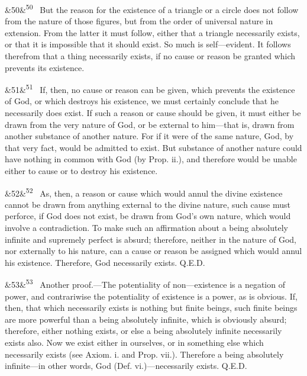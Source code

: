 \documentclass[12pt]{article}
\newcommand{\para}[1][]{\par\noindent\ifx&#1&\else\textsuperscript{\footnotesize #1}~\fi}
\begin{document}
\para[50] But the reason for the existence of a triangle or a circle does not follow from the nature of those figures, but from the order of universal nature in extension. From the latter it must follow, either that a triangle necessarily exists, or that it is impossible that it should exist. So much is self---evident. It follows therefrom that a thing necessarily exists, if no cause or reason be granted which prevents its existence.

\para[51] If, then, no cause or reason can be given, which prevents the existence of God, or which destroys his existence, we must certainly conclude that he necessarily does exist. If such a reason or cause should be given, it must either be drawn from the very nature of God, or be external to him---that is, drawn from another substance of another nature. For if it were of the same nature, God, by that very fact, would be admitted to exist. But substance of another nature could have nothing in common with God (by Prop. ii.), and therefore would be unable either to cause or to destroy his existence.

\para[52] As, then, a reason or cause which would annul the divine existence cannot be drawn from anything external to the divine nature, such cause must perforce, if God does not exist, be drawn from God's own nature, which would involve a contradiction. To make such an affirmation about a being absolutely infinite and supremely perfect is absurd; therefore, neither in the nature of God, nor externally to his nature, can a cause or reason be assigned which would annul his existence. Therefore, God necessarily exists. Q.E.D.

\para[53] Another proof.---The potentiality of non---existence is a negation of power, and contrariwise the potentiality of existence is a power, as is obvious. If, then, that which necessarily exists is nothing but finite beings, such finite beings are more powerful than a being absolutely infinite, which is obviously absurd; therefore, either nothing exists, or else a being absolutely infinite necessarily exists also. Now we exist either in ourselves, or in something else which necessarily exists (see Axiom. i. and Prop. vii.). Therefore a being absolutely infinite---in other words, God (Def. vi.)---necessarily exists. Q.E.D.
\end{document}

